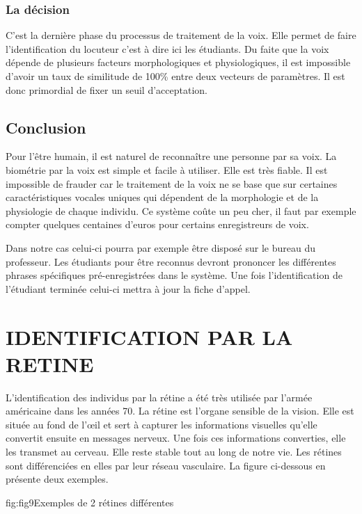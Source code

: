 \documentclass[overfullbox]{polytech/polytech}
\begin{document}
\subsubsection{La décision}
C'est la dernière phase du processus de traitement de la voix. Elle permet de faire l'identification du locuteur c'est à dire ici les étudiants. Du faite que la voix dépende de plusieurs facteurs morphologiques et physiologiques, il est impossible d'avoir un taux de similitude de 100\% entre deux vecteurs de paramètres. Il est donc primordial de fixer un seuil d'acceptation.

\subsection{Conclusion}

Pour l'être humain, il est naturel de reconnaître une personne par sa voix. La biométrie par la voix est simple et facile à utiliser. Elle est très fiable. Il est impossible de frauder car le traitement de la voix ne se base que sur certaines caractéristiques vocales uniques qui dépendent de la morphologie et de la physiologie de chaque individu. Ce système coûte un peu cher, il faut par exemple compter quelques centaines d'euros pour certains enregistreurs de voix. 

Dans notre cas celui-ci pourra par exemple être disposé sur le bureau du professeur. Les étudiants pour être reconnus devront prononcer les différentes phrases spécifiques pré-enregistrées dans le système. Une fois l'identification de l'étudiant terminée celui-ci mettra à jour la fiche d'appel.

\section{IDENTIFICATION PAR LA RETINE}
L'identification des individus par la rétine a été très utilisée par l'armée américaine dans les années 70.
La rétine est l'organe sensible de la vision. Elle est située au fond de l'œil et sert à capturer les informations visuelles qu'elle convertit ensuite en messages nerveux. Une fois ces informations converties, elle les transmet au cerveau. Elle reste stable tout au long de notre vie. Les rétines sont différenciées en elles par leur réseau vasculaire. La figure ci-dessous en présente deux exemples.

\begin{Figure}{fig:fig9}{Exemples de 2 rétines différentes}
\end{Figure}
\end{document}
